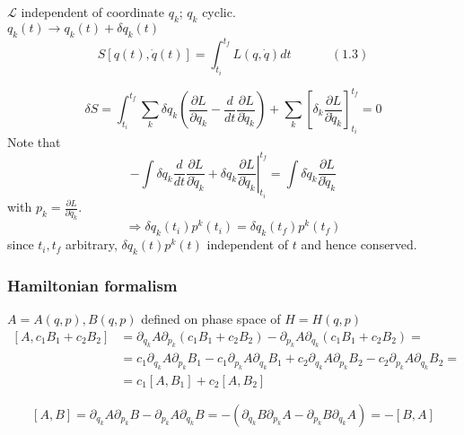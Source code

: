 \documentclass[twoside]{amsart}
\newcommand{\exercisehead}[1]
  {\smallskip
   \noindent{\large\bf Exercise #1.}
   }
\begin{document}
$\mathcal{L}$ independent of coordinate $q_k$; $q_k$ cyclic.  \\

$q_k(t) \to q_k(t) + \delta q_k(t)$
\begin{equation}
S[q(t), \dot{q}(t) ] = \int_{t_i}^{t_f} L(q,\dot{q}) dt \quad \quad \quad \, (1.3)
\end{equation}

\[
\delta S = \int_{t_i}^{t_f} \sum_k \delta q_k \left( \frac{ \partial L}{ \partial q_k} - \frac{d}{dt} \frac{ \partial L}{ \partial \dot{q}_k } \right) + \sum_k \left[ \delta_k \frac{ \partial L}{ \partial \dot{q}_k} \right]_{t_i}^{t_f} = 0 
\]
Note that 
\[
- \int \delta q_k \frac{d}{dt} \frac{ \partial L}{ \partial \dot{q}_k } + \delta q_k \left. \frac{ \partial L}{ \partial \dot{q}_k} \right|_{t_i}^{t_f} = \int \delta \dot{q}_k \frac{ \partial L}{ \partial \dot{q}_k }
\]
with $p_k = \frac{ \partial L}{ \partial \dot{q}_k}$.  
\begin{equation}
\Longrightarrow \delta q_k(t_i) p^k(t_i) = \delta q_k(t_f) p^k(t_f)
\end{equation}
since $t_i,t_f$ arbitrary, $\delta q_k(t) p^k(t)$ independent of $t$ and hence conserved.

\subsubsection{Hamiltonian formalism}

\exercisehead{1.1}  $A = A(q,p), B(q,p)$ defined on phase space of $H = H(q,p)$
\[
\begin{aligned}
  [A, c_1 B_1 + c_2 B_2 ] & = \partial_{q_k} A \partial_{p_k} (c_1 B_1 + c_2 B_2) - \partial_{p_k} A \partial_{q_k} ( c_1 B_1 + c_2 B_2) = \\
  & = c_1 \partial_{q_k} A \partial_{p_k} B_1 - c_1 \partial_{p_k} A \partial_{q_k} B_1 + c_2 \partial_{q_k} A \partial_{p_k} B_2 - c_2 \partial_{p_k} A \partial_{q_k} B_2 = \\
  & = c_1 [ A,B_1] + c_2 [A,B_2]
\end{aligned}
\]

\[
[A,B] = \partial_{q_k} A \partial_{p_k} B - \partial_{p_k} A \partial_{q_k} B = - (\partial_{q_k} B \partial_{p_k} A - \partial_{p_k} B \partial_{q_k} A ) = - [B,A]
\]
\end{document}
